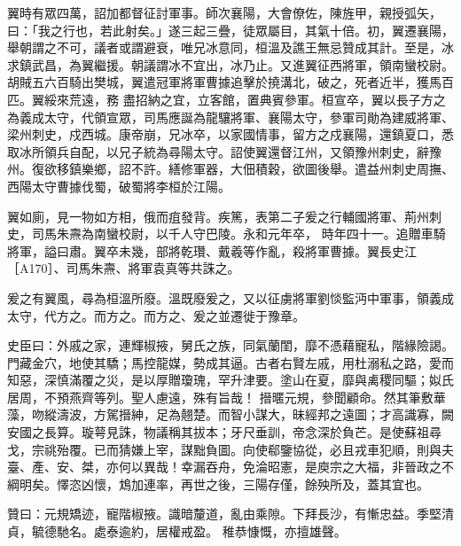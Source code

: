 \begin{pinyinscope}
 翼時有眾四萬，詔加都督征討軍事。師次襄陽，大會僚佐，陳旌甲，親授弧矢，曰：「我之行也，若此射矣。」遂三起三疊，徒眾屬目，其氣十倍。初，翼遷襄陽，舉朝謂之不可，議者或謂避衰，唯兄冰意同，桓溫及譙王無忌贊成其計。至是，冰求鎮武昌，為翼繼援。朝議謂冰不宜出，冰乃止。又進翼征西將軍，領南蠻校尉。胡賊五六百騎出樊城，翼遣冠軍將軍曹據追擊於撓溝北，破之，死者近半，獲馬百匹。翼綏來荒遠，務
 盡招納之宜，立客館，置典賓參軍。桓宣卒，翼以長子方之為義成太守，代領宣眾，司馬應誕為龍驤將軍、襄陽太守，參軍司勛為建威將軍、梁州刺史，戍西城。康帝崩，兄冰卒，以家國情事，留方之戍襄陽，還鎮夏口，悉取冰所領兵自配，以兄子統為尋陽太守。詔使翼還督江州，又領豫州刺史，辭豫州。復欲移鎮樂鄉，詔不許。繕修軍器，大佃積穀，欲圖後舉。遣益州刺史周撫、西陽太守曹據伐蜀，破蜀將李桓於江陽。



 翼如廁，見一物如方相，俄而疽發背。疾篤，表第二子爰之行輔國將軍、荊州刺史，司馬朱燾為南蠻校尉，以千人守巴陵。永和元年卒，
 時年四十一。追贈車騎將軍，謚曰肅。翼卒未幾，部將乾瓚、戴羲等作亂，殺將軍曹據。翼長史江［A170］、司馬朱燾、將軍袁真等共誅之。



 爰之有翼風，尋為桓溫所廢。溫既廢爰之，又以征虜將軍劉惔監沔中軍事，領義成太守，代方之。而方之。而方之、爰之並遷徙于豫章。



 史臣曰：外戚之家，連輝椒掖，舅氏之族，同氣蘭閨，靡不憑藉寵私，階緣險謁。門藏金穴，地使其驕；馬控龍媒，勢成其逼。古者右賢左戚，用杜溺私之路，愛而知惡，深慎滿覆之災，是以厚贈瓊瑰，罕升津要。塗山在夏，靡與禼稷同驅；姒氏居周，不預燕齊等列。聖人慮遠，殊有旨哉！
 搢暱元規，參聞顧命。然其筆敷華藻，吻縱濤波，方駕搢紳，足為翹楚。而智小謀大，昧經邦之遠圖；才高識寡，闕安國之長算。璇萼見誅，物議稱其拔本；牙尺垂訓，帝念深於負芒。是使蘇祖尋戈，宗祧殆覆。已而猜嫌上宰，謀黜負圖。向使郗鑒協從，必且戎車犯順，則與夫臺、產、安、桀，亦何以異哉！幸漏吞舟，免淪昭憲，是庾宗之大福，非晉政之不綱明矣。懌恣凶懷，鴆加連率，再世之後，三陽存僅，餘殃所及，蓋其宜也。



 贊曰：元規矯迹，寵階椒掖。識暗釐道，亂由乘隙。下拜長沙，有慚忠益。季堅清貞，毓德馳名。處泰逾約，居權戒盈。
 稚恭慷慨，亦擅雄聲。



\end{pinyinscope}